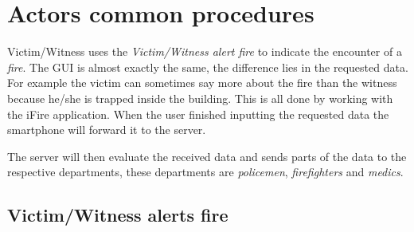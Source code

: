 





\section{Actors common procedures}

Victim/Witness uses the \emph{Victim/Witness alert fire} to indicate the
encounter of a \emph{fire}. The GUI is almost exactly the same, the difference
lies in the requested data. For example the victim can sometimes say more about
the fire than the witness because he/she is trapped inside the building. This is
all done by working with the iFire application.
When the user finished inputting the requested data the smartphone will forward
it to the server.

The server will then evaluate the received data and sends parts of the data to
the respective departments, these departments are \emph{policemen},
\emph{firefighters} and \emph{medics}.

\subsection{Victim/Witness alerts fire}

